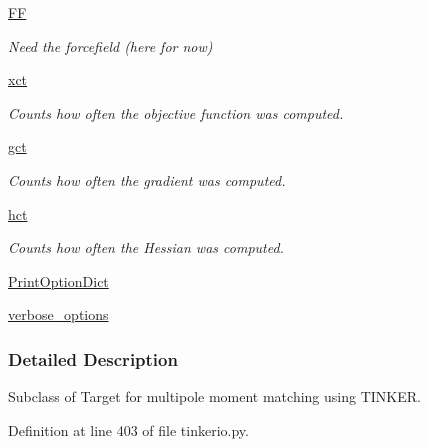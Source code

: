 \begin{DoxyCompactItemize}
\hyperlink{classforcebalance_1_1target_1_1Target_a796dc30a19a60c63fb43b088d40a963f}{\-F\-F}
\begin{DoxyCompactList}\small\item\em \-Need the forcefield (here for now) \end{DoxyCompactList}\item 
\hyperlink{classforcebalance_1_1target_1_1Target_ad4cd0ab38d8fc97d3e7a6e22ce130a16}{xct}
\begin{DoxyCompactList}\small\item\em \-Counts how often the objective function was computed. \end{DoxyCompactList}\item 
\hyperlink{classforcebalance_1_1target_1_1Target_aff6e42b84dd8eb5a4dc3b47aa58bc64c}{gct}
\begin{DoxyCompactList}\small\item\em \-Counts how often the gradient was computed. \end{DoxyCompactList}\item 
\hyperlink{classforcebalance_1_1target_1_1Target_ae929918b7e695a99d7ec946d06d793e1}{hct}
\begin{DoxyCompactList}\small\item\em \-Counts how often the \-Hessian was computed. \end{DoxyCompactList}\item 
\hyperlink{classforcebalance_1_1BaseClass_afc6659278497d7245bc492ecf405ccae}{\-Print\-Option\-Dict}
\item 
\hyperlink{classforcebalance_1_1BaseClass_afd68efa29ccd2f320f4cf82198214aac}{verbose\-\_\-options}
\end{DoxyCompactItemize}


\subsubsection{\-Detailed \-Description}
\-Subclass of \-Target for multipole moment matching using \-T\-I\-N\-K\-E\-R. 



\-Definition at line 403 of file tinkerio.\-py.



